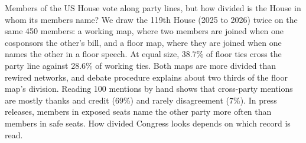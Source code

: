Members of the US House vote along party lines, but how divided is the House in whom its members name? We draw
the 119th House (2025 to 2026) twice on the same 450 members: a working map, where two members are joined when one
cosponsors the other's bill, and a floor map, where they are joined when one names the other in a floor speech. At
equal size, 38.7\% of floor ties cross the party line against 28.6\% of working ties. Both maps are more divided
than rewired networks, and debate procedure explains about two thirds of the floor map's division. Reading 100
mentions by hand shows that cross-party mentions are mostly thanks and credit (69\%) and rarely disagreement (7\%).
In press releases, members in exposed seats name the other party more often than members in safe seats. How
divided Congress looks depends on which record is read.
